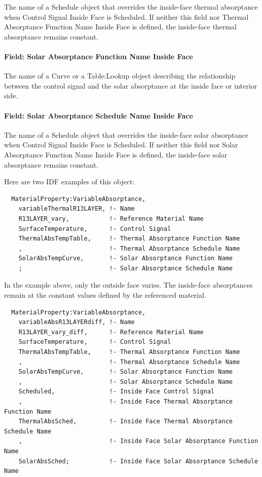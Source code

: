 The name of a Schedule object that overrides the inside-face thermal absorptance when Control Signal Inside Face is Scheduled. If neither this field nor Thermal Absorptance Function Name Inside Face is defined, the inside-face thermal absorptance remains constant.

\paragraph{Field: Solar Absorptance Function Name Inside Face}\label{field-solar-absorptance-function-name-inside-face}

The name of a Curve or a Table:Lookup object describing the relationship between the control signal and the solar absorptance at the inside face or interior side.

\paragraph{Field: Solar Absorptance Schedule Name Inside Face}\label{field-solar-absorptance-schedule-name-inside-face}

The name of a Schedule object that overrides the inside-face solar absorptance when Control Signal Inside Face is Scheduled. If neither this field nor Solar Absorptance Function Name Inside Face is defined, the inside-face solar absorptance remains constant.

Here are two IDF examples of this object:

\begin{lstlisting}
  MaterialProperty:VariableAbsorptance,
    variableThermalR13LAYER, !- Name
    R13LAYER_vary,           !- Reference Material Name
    SurfaceTemperature,      !- Control Signal
    ThermalAbsTempTable,     !- Thermal Absorptance Function Name
    ,                        !- Thermal Absorptance Schedule Name
    SolarAbsTempCurve,       !- Solar Absorptance Function Name
    ;                        !- Solar Absorptance Schedule Name
\end{lstlisting}

In the example above, only the outside face varies. The inside-face absorptances remain at the constant values defined by the referenced material.

\begin{lstlisting}
  MaterialProperty:VariableAbsorptance,
    variableAbsR13LAYERdiff, !- Name
    R13LAYER_vary_diff,      !- Reference Material Name
    SurfaceTemperature,      !- Control Signal
    ThermalAbsTempTable,     !- Thermal Absorptance Function Name
    ,                        !- Thermal Absorptance Schedule Name
    SolarAbsTempCurve,       !- Solar Absorptance Function Name
    ,                        !- Solar Absorptance Schedule Name
    Scheduled,               !- Inside Face Control Signal
    ,                        !- Inside Face Thermal Absorptance Function Name
    ThermalAbsSched,         !- Inside Face Thermal Absorptance Schedule Name
    ,                        !- Inside Face Solar Absorptance Function Name
    SolarAbsSched;           !- Inside Face Solar Absorptance Schedule Name
\end{lstlisting}

